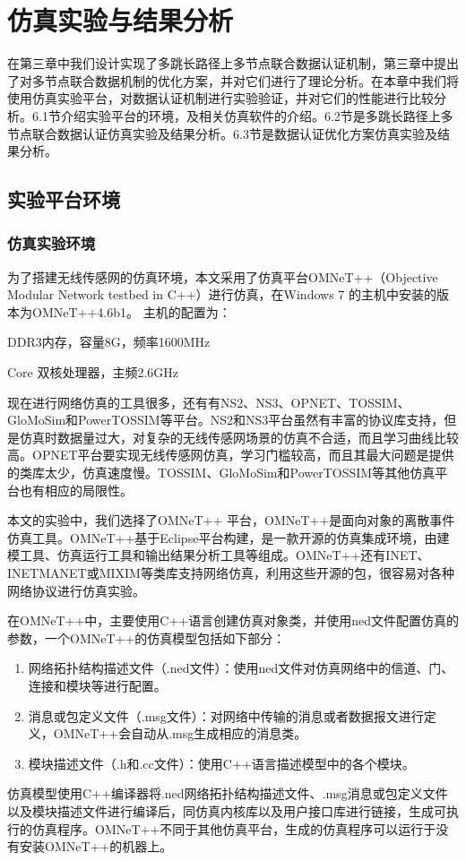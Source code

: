 \chapter{仿真实验与结果分析}
在第三章中我们设计实现了多跳长路径上多节点联合数据认证机制，第三章中提出了对多节点联合数据机制的优化方案，并对它们进行了理论分析。在本章中我们将使用仿真实验平台，对数据认证机制进行实验验证，并对它们的性能进行比较分析。6.1节介绍实验平台的环境，及相关仿真软件的介绍。6.2节是多跳长路径上多节点联合数据认证仿真实验及结果分析。6.3节是数据认证优化方案仿真实验及结果分析。
\section{实验平台环境}
\subsection{仿真实验环境}
为了搭建无线传感网的仿真环境，本文采用了仿真平台OMNeT++（Objective Modular Network testbed in C++）进行仿真，在Windows 7 的主机中安装的版本为OMNeT++4.6b1。 主机的配置为：
\begin{compactitem}
  \item DDR3内存，容量8G，频率1600MHz
  \item Core 双核处理器，主频2.6GHz
\end{compactitem}

现在进行网络仿真的工具很多，还有有NS2、NS3、OPNET、TOSSIM、GloMoSim和PowerTOSSIM等平台。NS2和NS3平台虽然有丰富的协议库支持，但是仿真时数据量过大，对复杂的无线传感网场景的仿真不合适，而且学习曲线比较高。OPNET平台要实现无线传感网仿真，学习门槛较高，而且其最大问题是提供的类库太少，仿真速度慢。TOSSIM、GloMoSim和PowerTOSSIM等其他仿真平台也有相应的局限性。

本文的实验中，我们选择了OMNeT++ 平台，OMNeT++是面向对象的离散事件仿真工具。OMNeT++基于Eclipse平台构建，是一款开源的仿真集成环境，由建模工具、仿真运行工具和输出结果分析工具等组成。OMNeT++还有INET、INETMANET或MIXIM等类库支持网络仿真，利用这些开源的包，很容易对各种网络协议进行仿真实验。

在OMNeT++中，主要使用C++语言创建仿真对象类，并使用ned文件配置仿真的参数，一个OMNeT++的仿真模型包括如下部分：
\begin{enumerate}\setlength{\itemsep}{-\itemsep}
  \item 网络拓扑结构描述文件（.ned文件）：使用ned文件对仿真网络中的信道、门、连接和模块等进行配置。
  \item 消息或包定义文件（.msg文件）：对网络中传输的消息或者数据报文进行定义，OMNeT++会自动从.msg生成相应的消息类。
  \item 模块描述文件（.h和.cc文件）：使用C++语言描述模型中的各个模块。
\end{enumerate}
仿真模型使用C++编译器将.ned网络拓扑结构描述文件、.msg消息或包定义文件以及模块描述文件进行编译后，同仿真内核库以及用户接口库进行链接，生成可执行的仿真程序。OMNeT++不同于其他仿真平台，生成的仿真程序可以运行于没有安装OMNeT++的机器上。

